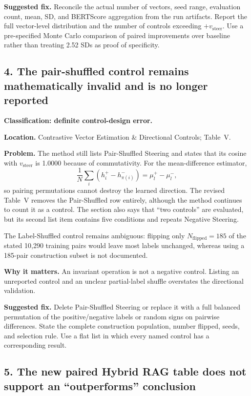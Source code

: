 \documentclass[11pt]{article}
\begin{document}
\textbf{Suggested fix.} Reconcile the actual number of vectors, seed range, evaluation count, mean, SD, and BERTScore aggregation from the run artifacts.  Report the full vector-level distribution and the number of controls exceeding $+v_{\text{steer}}$.  Use a pre-specified Monte Carlo comparison of paired improvements over baseline rather than treating 2.52 SDs as proof of specificity.

\subsection*{4. The pair-shuffled control remains mathematically invalid and is no longer reported}

\textbf{Classification: definite control-design error.}

\textbf{Location.} Contrastive Vector Estimation \& Directional Controls; Table~V.

\textbf{Problem.} The method still lists Pair-Shuffled Steering and states that its cosine with $v_{\text{steer}}$ is 1.0000 because of commutativity.  For the mean-difference estimator,
\[
 \frac{1}{N}\sum_i\left(h_i^+-h_{\pi(i)}^-\right)
 =\mu_l^+-\mu_l^-,
\]
so pairing permutations cannot destroy the learned direction.  The revised Table~V removes the Pair-Shuffled row entirely, although the method continues to count it as a control.  The section also says that ``two controls'' are evaluated, but its second list item contains five conditions and repeats Negative Steering.

The Label-Shuffled control remains ambiguous: flipping only $N_{\text{flipped}}=185$ of the stated 10,290 training pairs would leave most labels unchanged, whereas using a 185-pair construction subset is not documented.

\textbf{Why it matters.} An invariant operation is not a negative control.  Listing an unreported control and an unclear partial-label shuffle overstates the directional validation.

\textbf{Suggested fix.} Delete Pair-Shuffled Steering or replace it with a full balanced permutation of the positive/negative labels or random signs on pairwise differences.  State the complete construction population, number flipped, seeds, and selection rule.  Use a flat list in which every named control has a corresponding result.

\subsection*{5. The new paired Hybrid RAG table does not support an ``outperforms'' conclusion}
\end{document}
